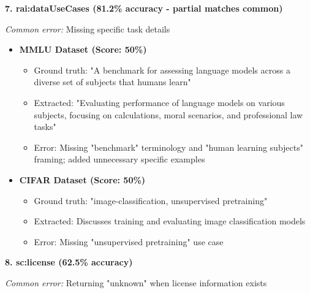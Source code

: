 \documentclass[11pt,a4paper]{article}
\begin{document}
\textbf{7. rai:dataUseCases (81.2\% accuracy - partial matches common)}

\textit{Common error:} Missing specific task details

\begin{itemize}[leftmargin=*]
    \item \textbf{MMLU Dataset (Score: 50\%)}
    \begin{itemize}
        \item Ground truth: "A benchmark for assessing language models across a diverse set of subjects that humans learn"
        \item Extracted: "Evaluating performance of language models on various subjects, focusing on calculations, moral scenarios, and professional law tasks"
        \item Error: Missing "benchmark" terminology and "human learning subjects" framing; added unnecessary specific examples
    \end{itemize}

    \item \textbf{CIFAR Dataset (Score: 50\%)}
    \begin{itemize}
        \item Ground truth: "image-classification, unsupervised pretraining"
        \item Extracted: Discusses training and evaluating image classification models
        \item Error: Missing "unsupervised pretraining" use case
    \end{itemize}
\end{itemize}

\textbf{8. sc:license (62.5\% accuracy)}

\textit{Common error:} Returning "unknown" when license information exists
\end{document}
